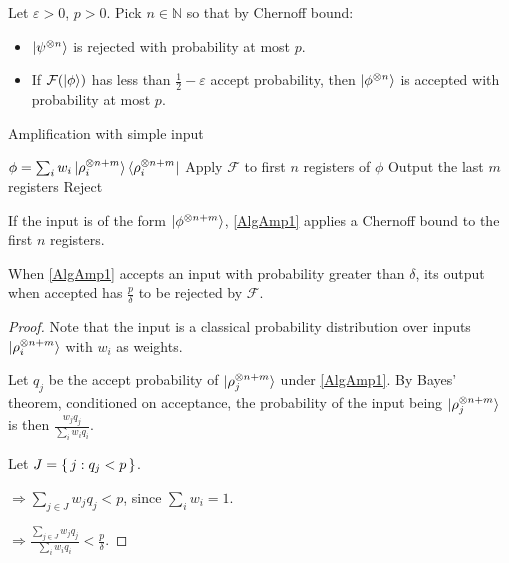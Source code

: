 Let $\varepsilon>0$, $p>0$. Pick $n\in\mathbb{N}$ so that by Chernoff bound:
\begin{itemize}
	\item $\ket{\psi^{\otimes n}}$ is rejected with probability at most $p$.
	\item If $\mathcal{F}(\ket{\phi})$ has less than $\frac{1}{2}-\varepsilon$ accept probability, then $\ket{\phi^{\otimes n}}$ is accepted with probability at most $p$.
\end{itemize}

\begin{algorithm}
	\caption{Amplification with simple input}
	\label{AlgAmp1}
	\begin{algorithmic}[1]
		\Require $\phi=\sum_i w_i\ket{\rho_i^{\otimes n+m}}\bra{\rho_i^{\otimes n+m}}$
		\State Apply $\mathcal{F}$ to first $n$ registers of $\phi$
			\State Output the last $m$ registers
		\Else
			\State Reject
		\EndIf
		\EndProcedure
	\end{algorithmic}
\end{algorithm}

\begin{observation}
	If the input is of the form $\ket{\phi^{\otimes n+m}}$, \autoref{AlgAmp1} applies a Chernoff bound to the first $n$ registers.
\end{observation}

\begin{theorem}
	When \autoref{AlgAmp1} accepts an input with probability greater than $\delta$, its output when accepted has $\frac{p}{\delta}$ to be rejected by $\mathcal{F}$.
\end{theorem}
\begin{proof}
	Note that the input is a classical probability distribution over inputs $\ket{\rho_i^{\otimes n+m}}$ with $w_i$ as weights.

	Let $q_j$ be the accept probability of $\ket{\rho_j^{\otimes n+m}}$ under \autoref{AlgAmp1}. By Bayes' theorem, conditioned on acceptance, the probability of the input being $\ket{\rho_j^{\otimes n+m}}$ is then $\frac{w_j q_j}{\sum_i w_i q_i}$.

	Let $J=\set{j:q_j<p}$.

	$\Rightarrow\sum_{j\in J} w_j q_j<p$, since $\sum_i w_i=1$.
	
	$\Rightarrow\frac{\sum_{j\in J} w_j q_j}{\sum_i w_i q_i}<\frac{p}{\delta}$.
\end{proof}

